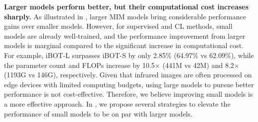 \textbf{Larger models perform better, but their computational cost increases sharply.}
As illustrated in , larger MIM models bring considerable performance gains over smaller models. However, for supervised and CL methods, small models are already well-trained, and the performance improvement from larger models is marginal compared to the significant increase in computational cost. For example, iBOT-L surpasses iBOT-S by only 2.85\% (64.97\% vs 62.09\%), while the parameter count and FLOPs increase by 10.5$\times$ (441M vs 42M) and 8.2$\times$ (1193G vs 146G), respectively. Given that infrared images are often processed on edge devices with limited computing budgets, using large models to pursue better performance is not cost-effective. Therefore, we believe improving small models is a more effective approach. In , we propose several strategies to elevate the performance of small models to be on par with larger models.
